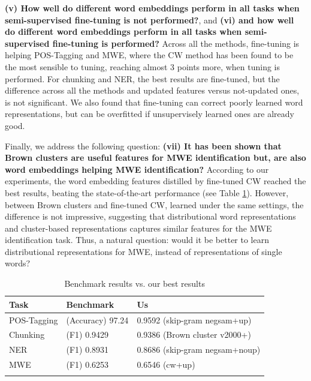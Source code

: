 
\textbf{(v) How well do different word embeddings perform in all tasks when semi-supervised fine-tuning is not performed?}, and 
\textbf{(vi) and how well do different word embeddings perform in all tasks when semi-supervised fine-tuning is performed?}
Across all the methods, fine-tuning is helping POS-Tagging and MWE, where the CW method has been found to be the most sensible to tuning, reaching almost 3 points more, when tuning is performed. 
For chunking and NER, the best results are fine-tuned, but the difference across all the methods and updated features versus not-updated ones, is not significant. 
We also found that fine-tuning can correct poorly learned word representations, but can be
overfitted if unsupervisely learned ones are already good. 

Finally, we address the following question: \textbf{(vii) It has been shown that Brown clusters are useful features for MWE identification but, are also word embeddings helping MWE identification?} 
According to our experiments, the word embedding features distilled by fine-tuned CW reached the best results, beating the state-of-the-art performance (see Table \ref{benchmark}).
However, between Brown clusters and fine-tuned CW, learned under the same settings, the difference is not impressive, suggesting that distributional word representations and cluster-based representations captures similar features for the MWE identification task.
Thus, a natural question: would it be better to learn distributional representations for MWE, instead of representations of single words?

\begin{table}
\caption{Benchmark results vs. our best results}
\begin{center}
\begin{small}
\begin{tabular}{lll}
\hline
\textbf{Task} & \textbf{Benchmark} & \textbf{Us} \\ \hline
POS-Tagging & (Accuracy) 97.24 \cite{Toutanova:2003} & 0.9592 (skip-gram negsam+up) \\ 
Chunking & (F1) 0.9429 \cite{Sha:2003} & 0.9386 (Brown cluster v2000+)\\  
NER & (F1) 0.8931 \cite{Ando:2005} & 0.8686 (skip-gram negsam+noup)\\  
MWE & (F1) 0.6253 \cite{Schneider+:2014} & 0.6546 (cw+up)\\ 
\hline
\label{benchmark}
\end{tabular}
\end{small}
\end{center}
\end{table}

